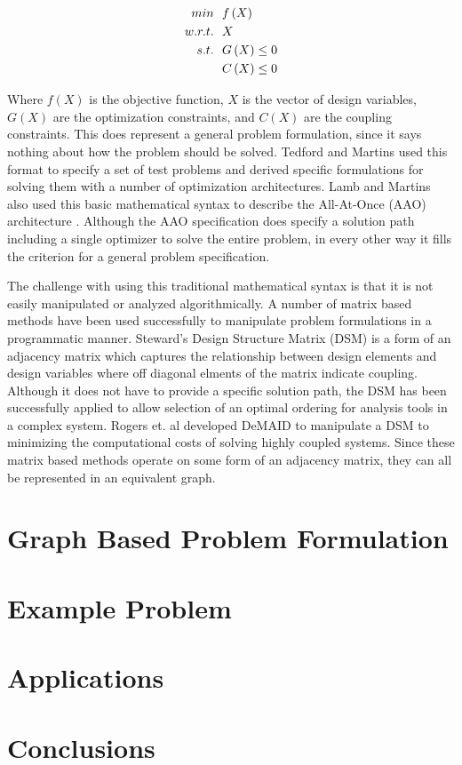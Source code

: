 \documentclass[]{aiaa-tc} %
\begin{document}
    \begin{align}
        min &\ \ f\left(X\right) \notag
        \\ w.r.t. &\ \  X \notag
        \\ s.t. &\ \ G\left(X\right) \leq 0
        \\      &\ \ C\left(X\right) \leq 0
    \end{align}

    Where $f(X)$ is the objective function, $X$ is the vector of design variables, $G(X)$ are the optimization constraints, 
    and $C(X)$ are the coupling constraints. This does represent a general problem formulation, since it says nothing about 
    how the problem should be solved. Tedford and Martins used this format to specify a set of test problems and derived specific formulations 
    for solving them with a number of optimization architectures\cite{Tedford2009}. Lamb and Martins also used this basic mathematical 
    syntax to describe the All-At-Once (AAO) architecture \cite{Lambe2011}. Although the AAO specification does specify a solution path 
    including a single optimizer to solve the entire problem, in every other way it fills the criterion for a general problem specification. 

    The challenge with using this traditional mathematical syntax is that it is not easily manipulated or analyzed algorithmically. 
    A number of matrix based methods have been used successfully to manipulate problem formulations in a programmatic manner. Steward's 
    Design Structure Matrix (DSM) is a form of an adjacency matrix which captures the relationship between design elements and 
    design variables where off diagonal elments of the matrix indicate coupling\cite{Steward1981}. 
    Although it does not have to provide a specific solution path, the DSM has been successfully 
    applied to allow selection of an optimal ordering for analysis tools in a complex system. Rogers et. al developed DeMAID to manipulate a
    DSM to minimizing the computational costs of solving highly coupled systems\cite{Rogers1996}. 
    Since these matrix based methods operate on some form of an adjacency matrix, they can all be represented in an equivalent graph. 



\section{Graph Based Problem Formulation}

\section{Example Problem}

\section{Applications}

\section{Conclusions}
\end{document}
